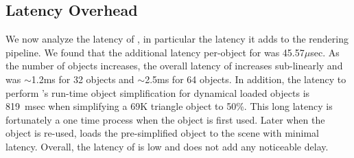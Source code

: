 %
%
%


%
%
%





\subsection{Latency Overhead}


We now analyze the latency of {\myit}, in particular the latency it adds to the rendering pipeline.  We found that the additional latency per-object for {\myit} was 45.57$\mu$sec. As the number of objects increases, the overall latency of {\myit} increases sub-linearly and was $\sim$1.2ms for 32 objects and $\sim$2.5ms for 64 objects. In addition, the latency to perform {\myit}'s run-time object simplification for dynamical loaded objects is 819~msec when simplifying a 69K triangle object to 50\%. This long latency is fortunately a one time process when the object is first used. Later when the object is re-used, {\myit} loads the pre-simplified object to the scene with minimal latency. Overall, the latency of {\myit} is low and does not add any noticeable delay.

